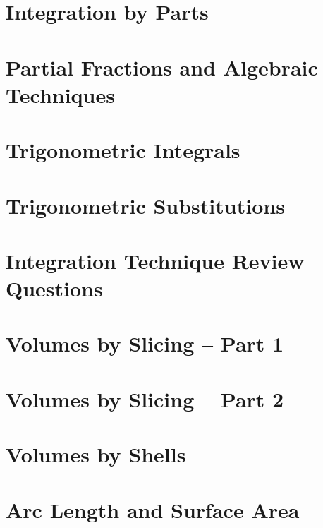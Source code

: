 \documentclass[twoside, addpoints, 12pt, letterpage]{exam}
\begin{document}
\section{Integration by Parts}
\cleardoublepage

\section{Partial Fractions and Algebraic Techniques}
\cleardoublepage

\section{Trigonometric Integrals}
\cleardoublepage

\section{Trigonometric Substitutions}
\cleardoublepage

\section{Integration Technique Review Questions}
\cleardoublepage

\section{Volumes by Slicing -- Part 1}
\cleardoublepage

\section{Volumes by Slicing -- Part 2}
\cleardoublepage

\section{Volumes by Shells}
\cleardoublepage

\section{Arc Length and Surface Area}
\cleardoublepage
\end{document}

